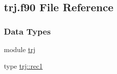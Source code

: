 \hypertarget{trj_8f90}{\subsection{trj.\-f90 File Reference}
\label{trj_8f90}
}
\subsubsection*{Data Types}
\begin{DoxyCompactItemize}
\item 
module \hyperlink{classtrj}{trj}
\item 
type \hyperlink{structtrj_1_1rec1}{trj\-::rec1}
\end{DoxyCompactItemize}
